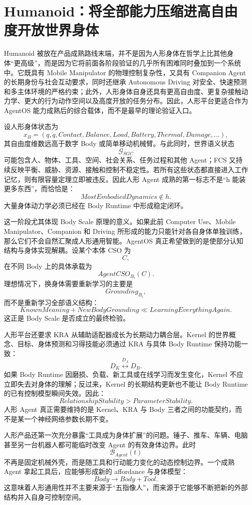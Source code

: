 \section{Humanoid：将全部能力压缩进高自由度开放世界身体}

Humanoid 被放在产品成熟路线末端，并不是因为人形身体在哲学上比其他身体“更高级”，而是因为它将前面各阶段验证的几乎所有困难同时叠加到一个系统中。它既具有 Mobile Manipulator 的物理控制复杂性，又具有 Companion Agent 的长期身份与社会互动要求，同时还继承 Autonomous Driving 对安全、快速预测和多主体环境的严格约束；此外，人形身体自身还具有更高自由度、更复杂接触动力学、更大的行为动作空间以及高度开放的任务分布。因此，人形平台更适合作为 AgentOS 能力成熟后的综合载体，而不是最早的理论验证入口。

设人形身体状态为
\[
x_B
=
(
q,\dot q,
Contact,
Balance,
Load,
Battery,
Thermal,
Damage,\ldots
),
\]
其自由度维数远高于数字 Body 或简单移动机械臂。与此同时，世界语义状态
\[
\mathcal{G}_{SGC}
\]
可能包含人、物体、工具、空间、社会关系、任务过程和其他 Agent；FCS 又持续反映平衡、威胁、资源、接触和控制不稳定性。若所有这些状态都直接进入工作记忆，则有限容量定理立即被违反。因此人形 Agent 成熟的第一标志不是“h 能装更多东西”，而恰恰是：
\[
\boxed{
MostEmbodiedDynamics\notin h.
}
\]
大量身体动力学必须已经在 Body Runtime 中形成稳定闭环。

这一阶段尤其体现 Body Scale 原理的意义。如果此前 Computer Use、Mobile Manipulator、Companion 和 Driving 所形成的能力只能针对各自身体单独训练，那么它们不会自然汇聚成人形通用智能。AgentOS 真正希望做到的是使部分认知结构与身体实现解耦。设某个本体 CSO 为
\[
C,
\]
在不同 Body 上的具体承载为
\[
AgentCSO_{B_i}(C).
\]
理想情况下，换身体需要重新学习的主要是
\[
Grounding_{B_i},
\]
而不是重新学习全部语义结构：
\[
\boxed{
KnownMeaning
+
NewBodyGrounding
\ll
LearningEverythingAgain.
}
\]
这正是 Body Scale 是否成立的最终检验。

人形平台还要求 KRA 从辅助适配器成长为长期动力耦合层。Kernel 的世界概念、目标、身体预测和习得技能必须通过 KRA 与具体 Body Runtime 保持功能一致：
\[
D_K
\overset{D_A}{\longleftrightarrow}
D_B.
\]
如果 Body Runtime 因磨损、负载、新工具或在线学习而发生变化，Kernel 不应立即失去对身体的理解；反过来，Kernel 的长期结构更新也不能让 Body Runtime 的已有控制模型瞬间失效。因此：
\[
\boxed{
RelationshipStability
>
ParameterStability.
}
\]
人形 Agent 真正需要维持的是 Kernel、KRA 与 Body 三者之间的功能契约，而不是某一个神经网络参数长期不变。

人形产品还第一次充分暴露“工具成为身体扩展”的问题。锤子、推车、车辆、电脑甚至另一台机器人都可能临时改变 Agent 的有效身体边界。此时
\[
\mathcal{B}_{Agent}(t)
\]
不再是固定机械外壳，而是随工具和行动能力变化的动态控制边界。一个成熟 Agent 拿起工具后，应能够形成新的 affordance 与身体模型：
\[
Body
\rightarrow
Body+Tool.
\]
这意味着人形通用性并不主要来源于“五指像人”，而来源于它能够不断把新的外部结构并入自身可控制空间。

